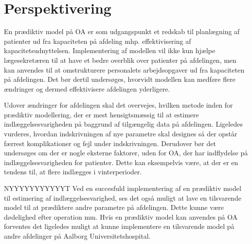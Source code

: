 \section{Perspektivering} 
En prædiktiv model på OA er som udgangspunkt et redskab til planlægning af patienter ud fra kapaciteten på afdeling mhp. effektivisering af kapacitetsudnyttelsen. Implementering af modellen vil ikke kun hjælpe lægesekretæren til at have et bedre overblik over patienter på afdelingen, men kan anvendes til at omstrukturere personalets arbejdsopgaver ud fra kapaciteten på afdelingen. Det bør dertil undersøges, hvorvidt modellen kan medføre flere ændringer og dermed effektivisere afdelingen yderligere. 


Udover ændringer for afdelingen skal det overvejes, hvilken metode inden for prædiktiv modellering, der er mest hensigtsmæssig til at estimere indlæggelsesvarigheden på baggrund af tilgængelig data på afdelingen. Ligeledes vurderes, hvordan indskrivningen af nye parametre skal designes så der opstår færrest komplikationer og fejl under indskrivningen. 
Derudover bør det undersøges om der er nogle eksterne faktorer, uden for OA, der har indflydelse på indlæggelsesvarigheden for patienter. Dette kan eksempelvis være, at der er en tendens til, at flere indlægges i vinterperioder.

NYYYYYYYYYYYT Ved en succesfuld implementering af en prædiktiv model til estimering af indlæggelsesvarighed, ses det også muligt at lave en tilsvarende model til at prædiktere andre parametre på afdelingen. Dette kunne være dødelighed efter operation mm.
Hvis en prædiktiv model kan anvendes på OA forventes det ligeledes muligt at kunne implementere en tilsvarende model på andre afdelinger på Aalborg Universitetshospital.